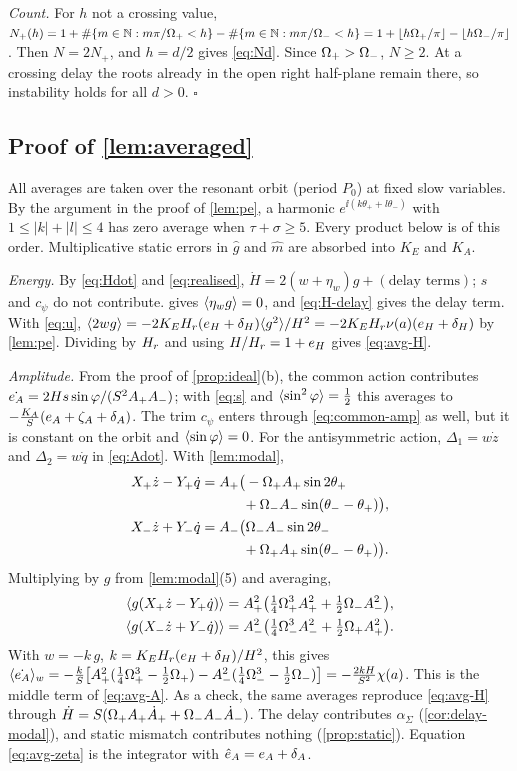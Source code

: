 \emph{Count.} For $h$ not a crossing value,
$N_+(h)=1+\#\{m\in\mathbb{N}:m\pi/\Omega_+<h\}-\#\{m\in\mathbb{N}:m\pi/\Omega_-<h\}
=1+\lfloor h\Omega_+/\pi\rfloor-\lfloor h\Omega_-/\pi\rfloor$.
Then $N=2N_+$, and $h=d/2$ gives \eqref{eq:Nd}.
Since $\Omega_+>\Omega_-$, $N\ge2$.
At a crossing delay the roots already in the open right half-plane remain there,
so instability holds for all $d>0$.
\hfill$\square$

\subsection{Proof of \cref{lem:averaged}}\label{app:averaged}
All averages are taken over the resonant orbit (period $P_0$) at fixed slow
variables.
By the argument in the proof of \cref{lem:pe}, a harmonic
$e^{\ii(k\theta_++l\theta_-)}$ with $1\le|k|+|l|\le4$ has zero average when
$\tau+\sigma\ge5$.
Every product below is of this order.
Multiplicative static errors in $\hat g$ and $\hat m$ are absorbed into $K_E$
and $K_A$.

\emph{Energy.}
By \eqref{eq:Hdot} and \eqref{eq:realised}, $\dot H=2(w+\eta_w)g+(\text{delay terms})$;
$s$ and $c_\psi$ do not contribute.
 gives $\langle \eta_wg\rangle=0$, and \eqref{eq:H-delay} gives the
delay term.
With \eqref{eq:u}, $\langle 2wg\rangle=-2K_EH_r(e_H+\delta_H)\langle g^2\rangle/H^2
=-2K_EH_r\nu(a)(e_H+\delta_H)$ by \cref{lem:pe}.
Dividing by $H_r$ and using $H/H_r=1+e_H$ gives \eqref{eq:avg-H}.

\emph{Amplitude.}
From the proof of \cref{prop:ideal}(b), the common action contributes
$\dot{e_A}=2Hs\sin\varphi/(S^2A_+A_-)$; with \eqref{eq:s} and
$\langle \sin^2\varphi\rangle=\tfrac12$ this averages to $-\tfrac{K_A}{S}(e_A+\zeta_A+\delta_A)$.
The trim $c_\psi$ enters through \eqref{eq:common-amp} as well, but it is constant
on the orbit and $\langle \sin\varphi\rangle=0$.
For the antisymmetric action, $\Delta_1=w\dot z$ and $\Delta_2=w\dot q$ in
\eqref{eq:Adot}.
With \cref{lem:modal},
\begin{align*}
  X_+\dot z-Y_+\dot q&=A_+\big(-\Omega_+ A_+\sin2\theta_+\\
     &\qquad\quad+\Omega_- A_-\sin(\theta_--\theta_+)\big),\\
  X_-\dot z+Y_-\dot q&=A_-\big(\Omega_- A_-\sin2\theta_-\\
     &\qquad\quad+\Omega_+ A_+\sin(\theta_--\theta_+)\big).
\end{align*}
Multiplying by $g$ from \cref{lem:modal}(5) and averaging,
\begin{align*}
  \langle g(X_+\dot z-Y_+\dot q)\rangle&=A_+^2\big(\tfrac14\Omega_+^3A_+^2+\tfrac12\Omega_- A_-^2\big),\\
  \langle g(X_-\dot z+Y_-\dot q)\rangle&=A_-^2\big(\tfrac14\Omega_-^3A_-^2+\tfrac12\Omega_+ A_+^2\big).
\end{align*}
With $w=-k\,g$, $k=K_EH_r(e_H+\delta_H)/H^2$, this gives
$\langle \dot{e_A}\rangle_w=-\tfrac{k}{S}\big[A_+^2(\tfrac14\Omega_+^3-\tfrac12\Omega_+)-A_-^2(\tfrac14\Omega_-^3-\tfrac12\Omega_-)\big]
=-\tfrac{2kH}{S^2}\chi(a)$.
This is the middle term of \eqref{eq:avg-A}.
As a check, the same averages reproduce \eqref{eq:avg-H} through
$\dot H=S(\Omega_+ A_+\dot A_++\Omega_- A_-\dot A_-)$.
The delay contributes $\alpha_\Sigma$ (\cref{cor:delay-modal}), and static
mismatch contributes nothing (\cref{prop:static}).
Equation \eqref{eq:avg-zeta} is the integrator with $\hat e_A=e_A+\delta_A$.

